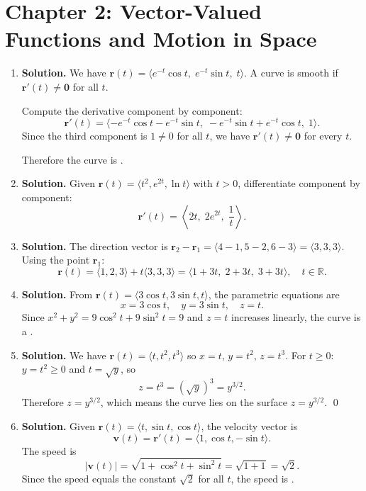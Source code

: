\chapter{Chapter 2: Vector-Valued Functions and Motion in Space}

\begin{enumerate}


\item \textbf{Solution.}
We have $\mathbf{r}(t)=\langle e^{-t}\cos t,\; e^{-t}\sin t,\; t\rangle$.
A curve is smooth if $\mathbf{r}'(t)\neq\mathbf{0}$ for all $t$.

Compute the derivative component by component:
\[
\mathbf{r}'(t)=\langle -e^{-t}\cos t - e^{-t}\sin t,\; -e^{-t}\sin t + e^{-t}\cos t,\; 1\rangle.
\]
Since the third component is $1\neq 0$ for all $t$, we have $\mathbf{r}'(t)\neq\mathbf{0}$ for every $t$.

Therefore the curve is .

\item \textbf{Solution.}
Given $\mathbf{r}(t)=\langle t^2, e^{2t}, \ln t\rangle$ with $t>0$, differentiate component by component:
\[
\boxed{\mathbf{r}'(t)=\left\langle 2t,\; 2e^{2t},\; \frac{1}{t}\right\rangle.}
\]

\item \textbf{Solution.}
The direction vector is $\mathbf{r}_2-\mathbf{r}_1=\langle 4-1, 5-2, 6-3\rangle=\langle 3,3,3\rangle$.
Using the point $\mathbf{r}_1$:
\[
\boxed{\mathbf{r}(t)=\langle 1,2,3\rangle + t\langle 3,3,3\rangle = \langle 1+3t,\; 2+3t,\; 3+3t\rangle,\quad t\in\mathbb{R}.}
\]

\item \textbf{Solution.}
From $\mathbf{r}(t)=\langle 3\cos t, 3\sin t, t\rangle$, the parametric equations are
\[
x=3\cos t,\quad y=3\sin t,\quad z=t.
\]
Since $x^2+y^2=9\cos^2 t+9\sin^2 t=9$ and $z=t$ increases linearly, the curve is a .

\item \textbf{Solution.}
We have $\mathbf{r}(t)=\langle t, t^2, t^3\rangle$ so $x=t$, $y=t^2$, $z=t^3$.
For $t\ge 0$: $y=t^2\ge 0$ and $t=\sqrt{y}$, so
\[
z = t^3 = (\sqrt{y})^3 = y^{3/2}.
\]
Therefore $z=y^{3/2}$, which means the curve lies on the surface $z=y^{3/2}$. \qed

\item \textbf{Solution.}
Given $\mathbf{r}(t)=\langle t, \sin t, \cos t\rangle$, the velocity vector is
\[
\mathbf{v}(t)=\mathbf{r}'(t)=\langle 1, \cos t, -\sin t\rangle.
\]
The speed is
\[
|\mathbf{v}(t)|=\sqrt{1+\cos^2 t+\sin^2 t}=\sqrt{1+1}=\sqrt{2}.
\]
Since the speed equals the constant $\sqrt{2}$ for all $t$, the speed is .


\end{enumerate}
